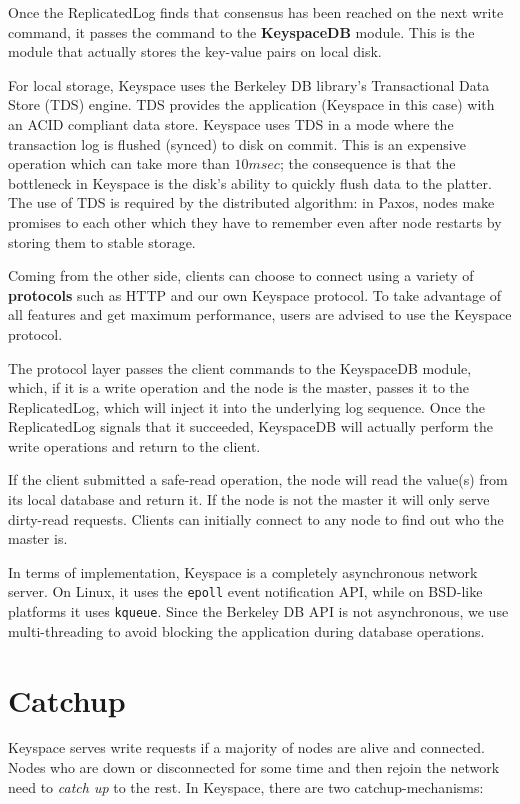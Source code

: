 \documentclass[12pt]{article}
\begin{document}
Once the ReplicatedLog finds that consensus has been reached on the next write command, it passes the command to the \textbf{KeyspaceDB} module. This is the module that actually stores the key-value pairs on local disk.

For local storage, Keyspace uses the Berkeley DB library's Transactional Data Store (TDS) engine. TDS provides the application (Keyspace in this case) with an ACID compliant data store. Keyspace uses TDS in a mode where the transaction log is flushed (synced) to disk on commit. This is an expensive operation which can take more than $10msec$; the consequence is that the bottleneck in Keyspace is the disk's ability to quickly flush data to the platter. The use of TDS is required by the distributed algorithm: in Paxos, nodes make promises to each other which they have to remember even after node restarts by storing them to stable storage.

Coming from the other side, clients can choose to connect using a variety of \textbf{protocols} such as HTTP and our own Keyspace protocol. To take advantage of all features and get maximum performance, users are advised to use the Keyspace protocol.

The protocol layer passes the client commands to the KeyspaceDB module, which, if it is a write operation and the node is the master, passes it to the ReplicatedLog, which will inject it into the underlying log sequence. Once the ReplicatedLog signals that it succeeded, KeyspaceDB will actually perform the write operations and return to the client.

If the client submitted a safe-read operation, the node will read the value(s) from its local database and return it. If the node is not the master it will only serve dirty-read requests. Clients can initially connect to any node to find out who the master is.

In terms of implementation, Keyspace is a completely asynchronous network server. On Linux, it uses the \texttt{epoll} event notification API, while on BSD-like platforms it uses \texttt{kqueue}. Since the Berkeley DB API is not asynchronous, we use multi-threading to avoid blocking the application during database operations.

\section{ Catchup }

Keyspace serves write requests if a majority of nodes are alive and connected. Nodes who are down or disconnected for some time and then rejoin the network need to \textit{catch up} to the rest. In Keyspace, there are two catchup-mechanisms:
\end{document}
